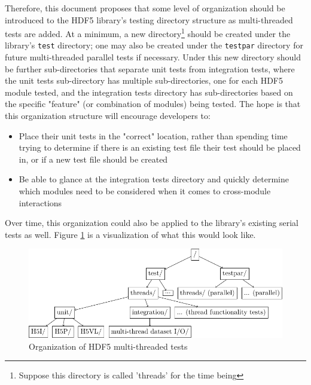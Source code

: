 \documentclass[../HDF5_RFC.tex]{subfiles}
\begin{document}
Therefore, this document proposes that some level of organization should be introduced to the HDF5 library's
testing directory structure as multi-threaded tests are added. At a minimum, a new directory\footnote{Suppose this directory is called 'threads' for the time being} should be created under the library's \texttt{test} directory; one may also be created under the \texttt{testpar} directory for future multi-threaded parallel tests if necessary. Under this new directory should be further sub-directories that separate unit tests
from integration tests, where the unit tests sub-directory has multiple sub-directories, one for each HDF5 module tested, and the integration tests directory has sub-directories based on the specific "feature" (or combination of modules) being tested. The hope is that this organization structure will encourage developers to:

\begin{itemize}

    \item Place their unit tests in the "correct" location, rather than spending time trying to determine if
          there is an existing test file their test should be placed in, or if a new test file should be
          created
    \item Be able to glance at the integration tests directory and quickly determine which modules need to
          be considered when it comes to cross-module interactions

\end{itemize}

Over time, this organization could also be applied to the library's existing serial tests as well. Figure \ref{fig:mt_test_dirs} is a visualization of what this would look like.

\begin{figure}
    \centering
    \includegraphics[width=0.8\linewidth]{images/MT_test_dirs.pdf}
    \caption{Organization of HDF5 multi-threaded tests}
    \label{fig:mt_test_dirs}
\end{figure}
\end{document}
